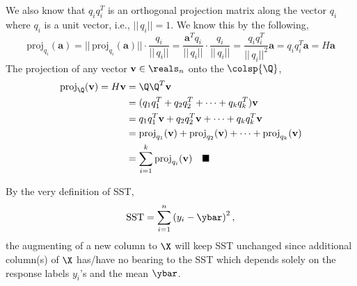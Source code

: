 \documentclass[12pt]{article}
\begin{document}
\begin{enumerate}
\begin{tcolorbox}[colback = white, sharp corners]
We also know that $q_i q_i^T$ is an orthogonal projection matrix along the vector $q_i$ where $q_i$ is a unit vector, i.e., $||\, q_i || = 1$. We know this by the following,
\[
\text{proj}_{q_i}(\mathbf{a}) = ||\, \text{proj}_{q_i}(\mathbf{a}) || \cdot \dfrac{q_i}{||\, q_i ||} =  \dfrac{\mathbf{a}^T q_i}{||\, q_i ||} \cdot \dfrac{q_i}{||\, q_i ||} = \dfrac{q_i q_i^T}{|| \, q_i ||^2} \mathbf{a} = q_i q_i^T \mathbf{a} = H\mathbf{a}
\]
The projection of any vector $\mathbf{v} \in \reals_n$ onto the $\colsp{\Q}$,
\begin{align*}
\text{proj}_{\Q}(\mathbf{v}) = H \mathbf{v} 
&= \Q \Q^T \mathbf{v}\\
&= ( q_1 q_1^T + q_2 q_2^T + \cdots + q_k q_k^T) \mathbf{v} \\
&= q_1 q_1^T \mathbf{v} + q_2 q_2^T \mathbf{v} + \cdots + q_k q_k^T \mathbf{v} \\
&= \text{proj}_{q_1}(\mathbf{v}) + \text{proj}_{q_2}(\mathbf{v}) + \cdots + \text{proj}_{q_k}(\mathbf{v}) \\
&= \sum_{i = 1}^k \text{proj}_{q_i}(\mathbf{v}) \quad \blacksquare
\end{align*}



\end{tcolorbox}


\begin{tcolorbox}[colback = white, sharp corners]

By the very definition of SST, 
\[
	\text{SST} = \sum_{i=1}^n \left(y_i - \ybar \right)^2,
\]
the augmenting of a new column to $\X$ will keep SST unchanged since additional column(s) of $\X$ has/have no bearing to the SST which depends solely on the response labels $y_i$'s and the mean $\ybar$.


\end{tcolorbox}

\newpage

\begin{tcolorbox}[colback = white, sharp corners]


\end{tcolorbox}
\end{enumerate}
\end{document}
